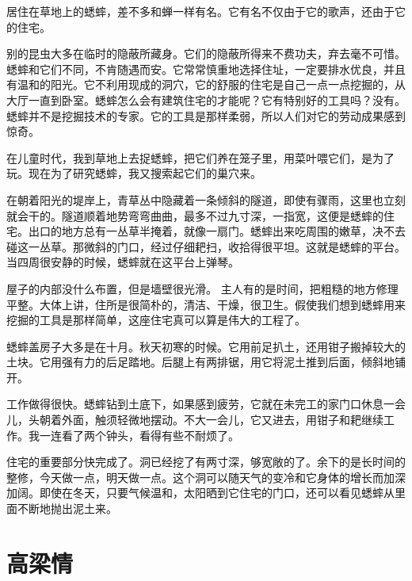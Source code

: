 \documentclass[12pt,UTF-8,openany]{ctexbook}
\begin{document}
\begin{large}
    
    居住在草地上的蟋蟀，差不多和蝉一样有名。它有名不仅由于它的歌声，还由于它的住宅。
    
    别的昆虫大多在临时的隐蔽所藏身。它们的隐蔽所得来不费功夫，弃去毫不可惜。蟋蟀和它们不同，不肯随遇而安。它常常慎重地选择住址，一定要排水优良，并且有温和的阳光。它不利用现成的洞穴，它的舒服的住宅是自己一点一点挖掘的，从大厅一直到卧室。蟋蟀怎么会有建筑住宅的才能呢？它有特别好的工具吗？没有。蟋蟀并不是挖掘技术的专家。它的工具是那样柔弱，所以人们对它的劳动成果感到惊奇。
    
    在儿童时代，我到草地上去捉蟋蟀，把它们养在笼子里，用菜叶喂它们，是为了玩。现在为了研究蟋蟀，我又搜索起它们的巢穴来。
    
    在朝着阳光的堤岸上，青草丛中隐藏着一条倾斜的隧道，即使有骤雨，这里也立刻就会干的。隧道顺着地势弯弯曲曲，最多不过九寸深，一指宽，这便是蟋蟀的住宅。出口的地方总有一丛草半掩着，就像一扇门。蟋蟀出来吃周围的嫩草，决不去碰这一丛草。那微斜的门口，经过仔细耙扫，收拾得很平坦。这就是蟋蟀的平台。当四周很安静的时候，蟋蟀就在这平台上弹琴。
    
    屋子的内部没什么布置，但是墙壁很光滑。 主人有的是时间，把粗糙的地方修理平整。大体上讲，住所是很简朴的，清洁、干燥，很卫生。假使我们想到蟋蟀用来挖掘的工具是那样简单，这座住宅真可以算是伟大的工程了。
    
    蟋蟀盖房子大多是在十月。秋天初寒的时候。它用前足扒土，还用钳子搬掉较大的土块。它用强有力的后足踏地。后腿上有两排锯，用它将泥土推到后面，倾斜地铺开。
    
    工作做得很快。蟋蟀钻到土底下，如果感到疲劳，它就在未完工的家门口休息一会儿，头朝着外面，触须轻微地摆动。不大一会儿，它又进去，用钳子和耙继续工作。我一连看了两个钟头，看得有些不耐烦了。
    
    住宅的重要部分快完成了。洞已经挖了有两寸深，够宽敞的了。余下的是长时间的整修，今天做一点，明天做一点。这个洞可以随天气的变冷和它身体的增长而加深加阔。即使在冬天，只要气候温和，太阳晒到它住宅的门口，还可以看见蟋蟀从里面不断地抛出泥土来。
    
\end{large}



\chapter{高梁情}
\end{document}
